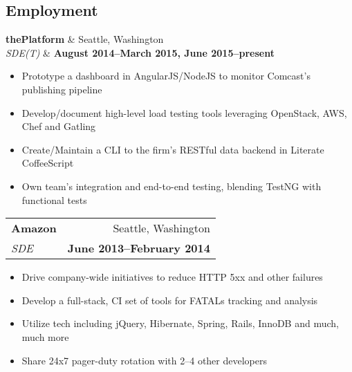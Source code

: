\documentclass[line,margin]{res}
\begin{document}
 

\address{brendan@\href{http://is.gd/bmlBio}{luchenlabs.com}}
\address{\href{http://is.gd/bmlGithub}{\textsl{github.com/Cheezmeister}}}

\begin{resume}

 
\section{\sc Employment}
\begin{table}
    \begin{tabular}
        \textbf{thePlatform} & \hfill Seattle, Washington  \\
        \textit{SDE(T)} & \hfill \textbf{August 2014--March 2015, June 2015--present}
    \end{tabular}
\end{table}
    \vspace{0.05in}
    \begin{itemize}
        \item Prototype a dashboard in AngularJS/NodeJS to monitor Comcast's publishing pipeline 
        \item Develop/document high-level load testing tools leveraging OpenStack, AWS, Chef and Gatling
        \item Create/Maintain a CLI to the firm's RESTful data backend in Literate CoffeeScript
        \item Own team's integration and end-to-end testing, blending TestNG with functional tests
    \end{itemize}

    \begin{tabular*}{0.9\textwidth}{@{\extracolsep{\fill} }lr}
        \textbf{Amazon} & \hfill Seattle, Washington  \\
        \textit{SDE} & \hfill \textbf{June 2013--February 2014}
    \end{tabular*}
    \vspace{0.05in}
    \begin{itemize}
        \item Drive company-wide initiatives to reduce HTTP 5xx and other failures
        \item Develop a full-stack, CI set of tools for FATALs tracking and analysis
        \item Utilize tech including jQuery, Hibernate, Spring, Rails, InnoDB and much, much more
        \item Share 24x7 pager-duty rotation with 2--4 other developers
    \end{itemize}


\end{resume}
\end{document}
